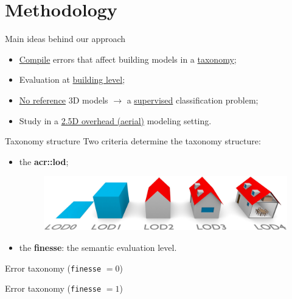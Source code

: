 \documentclass[10pt]{beamer}
\begin{document}
    \section{Methodology}
        \begin{frame}{Main ideas behind our approach}
            \begin{itemize}[label=$\blacktriangleright$, font=\color{IGNGreen}, itemsep=2em]
                \item<1-> \underline{Compile} errors that affect building models in a \underline{taxonomy};
                \item<2-> Evaluation at \underline{building level};
                \item<3-> \underline{No reference} 3D models $\longrightarrow$ a \underline{supervised} classification problem;
                \item<4-> Study in a \underline{2.5D overhead (aerial)} modeling setting.
            \end{itemize}
        \end{frame}
        \begin{frame}{Taxonomy structure}
            Two criteria determine the taxonomy structure:
            \begin{itemize}[label=$\blacktriangleright$, font=\color{IGNGreen}, itemsep=2em]
                \item<2-> the \textbf{\acrfull{acr::lod}};
                    \begin{figure}[H]
                        \centering
                        \includegraphics[width=.7\textwidth]{images/introduction/lods}
                    \end{figure}
                \item<3-> the \textbf{finesse}: the semantic evaluation level.
            \end{itemize}
        \end{frame}
        \begin{frame}{Error taxonomy (\texttt{finesse} $= 0$)}
            
        \end{frame}
        \begin{frame}{Error taxonomy (\texttt{finesse} $= 1$)}
            
        \end{frame}
\end{document}
